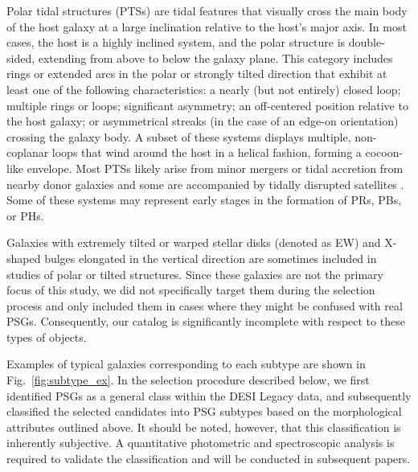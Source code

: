 \documentclass{aa}
\begin{document}
Polar tidal structures (PTSs) are tidal features that visually cross the main body of the host galaxy at a large inclination relative to the host’s major axis. In most cases, the host is a highly inclined system, and the polar structure is double-sided, extending from above to below the galaxy plane. This category includes rings or extended arcs in the polar or strongly tilted direction that exhibit at least one of the following characteristics: a nearly (but not entirely) closed loop; multiple rings or loops; significant asymmetry; an off-centered position relative to the host galaxy; or asymmetrical streaks (in the case of an edge-on orientation) crossing the galaxy body. A subset of these systems displays multiple, non-coplanar loops that wind around the host in a helical fashion, forming a cocoon-like envelope. Most PTSs likely arise from minor mergers or tidal accretion from nearby donor galaxies and some are accompanied by tidally disrupted satellites \citep{2010AJ....140..962M,2024MNRAS.530.4422K,2025A&A...700A.176M}. Some of these systems may represent early stages in the formation of PRs, PBs, or PHs.

Galaxies with extremely tilted or warped stellar disks (denoted as EW) and X-shaped bulges elongated in the vertical direction are sometimes included in studies of polar or tilted structures. Since these galaxies are not the primary focus of this study, we did not specifically target them during the selection process and only included them in cases where they might be confused with real PSGs. Consequently, our catalog is significantly incomplete with respect to these types of objects.

Examples of typical galaxies corresponding to each subtype are shown in Fig.~\ref{fig:subtype_ex}. In the selection procedure described below, we first identified PSGs as a general class within the DESI Legacy data, and subsequently classified the selected candidates into PSG subtypes based on the morphological attributes outlined above. It should be noted, however, that this classification is inherently subjective. A quantitative photometric and spectroscopic analysis is required to validate the classification and will be conducted in subsequent papers.
\end{document}
